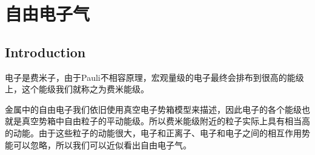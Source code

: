 \chapter{自由电子气} %
\label{cha:自由电子气}
\section{Introduction} %
\label{sec:Introduction 8}
电子是费米子，由于Pauli不相容原理，宏观量级的电子最终会排布到很高的能级上，这个能级我们就称之为费米能级。

金属中的自由电子我们依旧使用真空电子势箱模型来描述，因此电子的各个能级也就是真空势箱中自由粒子的平动能级。所以费米能级附近的粒子实际上具有相当高的动能。由于这些粒子的动能很大，电子和正离子、电子和电子之间的相互作用势能可以忽略，所以我们可以近似看出自由电子气。
